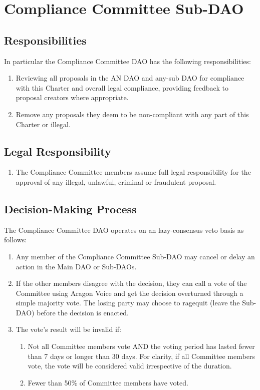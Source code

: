 \section{Compliance Committee Sub-DAO}

\subsection{Responsibilities}

In particular the Compliance Committee \ac{DAO} has the following responsibilities:
\begin{enumerate}
	\item Reviewing all proposals in the AN \ac{DAO} and any-sub \ac{DAO} for
	compliance with this Charter and overall legal compliance,
	providing feedback to proposal creators where appropriate.
	\item Remove any proposals they deem to be non-compliant with any
	part of this Charter or illegal.
\end{enumerate}


\subsection{Legal Responsibility}

\begin{enumerate}
	\item The Compliance Committee members assume full legal responsibility for the approval of any illegal, unlawful, criminal or fraudulent proposal.
\end{enumerate}


\subsection{Decision-Making Process}

The Compliance Committee \ac{DAO} operates on an lazy-consensus veto basis as follows:
\begin{enumerate}
	
	\item Any member of the Compliance Committee Sub-\ac{DAO} may cancel or delay an action in the Main \ac{DAO} or Sub-\acp{DAO}.
	\item If the other members disagree with the decision, they can call a vote of the Committee using Aragon Voice and get the decision overturned through a simple majority vote.
	The losing party may choose to ragequit (leave the Sub-\ac{DAO}) before the decision is enacted.
	\item The vote’s result will be invalid if:
	\begin{enumerate}
		\item Not all Committee members vote AND the voting period
		has lasted fewer than 7 days or longer than 30 days.
		For clarity, if all Committee members vote, the vote will be considered valid irrespective of the duration.
		\item Fewer than 50\% of Committee members have voted.
	\end{enumerate}

\end{enumerate}

